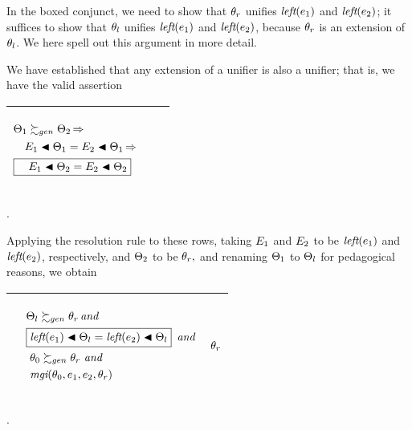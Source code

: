 \documentclass[runningheads]{llncs}
\DeclareMathOperator{\uand}{\emph{and}\,}
\DeclareMathOperator{\uimplies}{\Rightarrow}
\DeclareMathOperator{\lef}{\emph{left}}
\DeclareMathOperator{\mgi}{\emph{mgi}}
\begin{document}
In the boxed conjunct, we need to show that $\theta_{r}$ unifies $\lef(\e{1})$ and $\lef(\e{2})$; it suffices to show that $\theta_{l}$ unifies $\lef(\e{1})$ and $\lef(\e{2})$, because $\theta_{r}$ is an extension of $\theta_{l}$. We here spell out this argument in more detail.

We have established that any extension of a unifier is also a unifier;  that is, we have the valid assertion
\begin{center}
  \begin{tabular}{|m{}|m{}||m{}|}
\hline
\begin{center}
$\begin{aligned}
    &\Thet{1} \moregen \Thet{2} \uimplies \\
    &\begin{aligned}
         & \quad \E{1} \apply \Thet{1} = \E{2} \apply \Thet{1} \uimplies \\
         & \boxed{\quad \E{1} \apply \Thet{2} = \E{2} \apply \Thet{2}}
    \end{aligned}
\end{aligned}$
\end{center}& &  \\  \hline
\end{tabular}.
\end{center}
Applying the resolution rule to these rows, taking $E_{1}$ and $E_{2}$ to be
$\lef(\e{1})$ and $\lef(\e{2})$, respectively, and $\Theta_{2}$ to be $\theta_{r},$ and renaming $\Theta_{1}$ to $\Theta_{l}$ for pedagogical reasons,  we obtain
\begin{center}
\begin{tabular}{|m{}|m{}||m{}|}
 \hline 
  & 
   \begin{center}
{$\begin{aligned}
 &\Thet{l} \moregen \thet{r}  \uand  \\
  &\boxed{\lef(\e{1}) \apply \Thet{l} = 
          \lef(\e{2}) \apply \Thet{l}} \,\, \uand  \\
&\,
   \,\thet{0} \moregen \thet{r} \,  \uand \\
  &\,  \,{\mgi}(\thet{0}, \e{1}, \e{2}, \thet{r})
\end{aligned}$}
\end{center}
& 
\begin{center}
$
\theta_{r}
$
\end{center}
\\
\hline
\end{tabular}.
\end{center}
\end{document}
